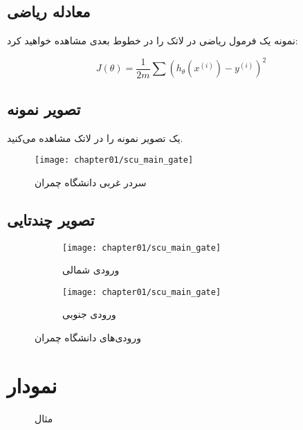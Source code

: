 \subsection{معادله ریاضی}\label{sec:math-equation}
نمونه یک فرمول ریاضی در لاتک را در خطوط بعدی مشاهده خواهید کرد:

\begin{equation}
	\label{eq:a}
    J(\theta)=\frac{1}{2 m} \sum\left(h_{\theta}\left(x^{(i)}\right)-y^{(i)}\right)^{2}
\end{equation}

\subsection{تصویر نمونه}\label{sec:sample-image}
یک تصویر نمونه را در لاتک مشاهده می‌کنید.

\begin{figure}[H]
    \label{fig:main-gate}
    \texttt{[image: chapter01/scu\_main\_gate]}
    \caption{سردر غربی دانشگاه چمران}
\end{figure}

\subsection{تصویر چندتایی}\label{sec:multi-image}
\begin{figure}[H]
	\begin{subfigure}[t]{5cm}
		\centering
		\texttt{[image: chapter01/scu\_main\_gate]}
		\caption{ورودی شمالی}\label{fig:1a}		
	\end{subfigure}
	\quad
	\begin{subfigure}[t]{5cm}
		\centering
		\texttt{[image: chapter01/scu\_main\_gate]}
		\caption{ورودی جنوبی}\label{fig:1b}
	\end{subfigure}
	\caption{ورودی‌های دانشگاه چمران}\label{fig:1}
\end{figure}


\section{نمودار}

\begin{figure}[H]
	\caption{مثال}
\end{figure}

